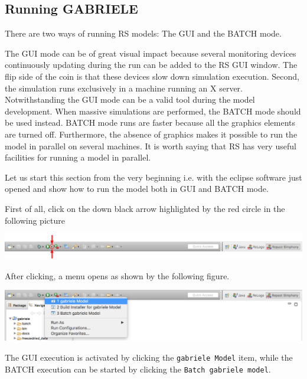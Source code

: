 \documentclass{book}
\begin{document}


\subsection{Running GABRIELE}


There are two ways of running RS models: The GUI and the BATCH mode.

The GUI mode can be of great visual impact because several monitoring devices continuously updating during the run can be added to the RS GUI window. The flip side of the coin is that these devices slow down simulation execution. Second, the simulation runs exclusively in a machine running an X server. Notwithstanding the GUI mode can be a valid tool during the model development. When massive simulations are performed, the BATCH mode should be used instead. BATCH mode runs are faster because all the graphics elements are turned off. Furthermore, the absence of graphics makes it possible to run the model in parallel on several machines. It is worth saying that RS has very useful facilities for running a model in parallel.


Let us start this section from the very beginning i.e. with the eclipse software just opened and show how to run the model both in GUI and BATCH mode.

First of all, click on the down black arrow highlighted by the red circle in the following picture

\vskip2mm
\noindent
\includegraphics[scale=0.195]{fig_gabriele_rs_execution1a}

After clicking, a menu opens as shown by the following figure. 

\vskip2mm
\noindent
\includegraphics[scale=0.35]{fig_gabriele_rs_execution2}

\vskip2mm
The GUI execution is activated by clicking the \verb+gabriele Model+ item, while the BATCH execution can be started by clicking the \verb+Batch gabriele model+.
\end{document}
